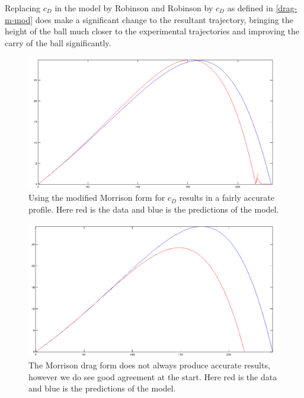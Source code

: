 Replacing $c_D$ in the model by Robinson and Robinson by $c_D$ as defined in \eqref{drag-m-mod} does
make a significant change to the resultant trajectory, bringing the height of the ball much closer to
the experimental trajectories and improving the carry of the ball significantly.


\begin{figure}[h]
\centering
\includegraphics[scale=0.5]{../images/trajectory-older.png}
\caption[Model with $c_{D}$ dependent on $Re$.]{Using the modified Morrison form for $c_{D}$ results 
in a fairly accurate profile. Here red is the data and blue is the predictions of the model.}
\end{figure}

\begin{figure}[h]
\centering
\includegraphics[scale=0.45]{../images/trajectory.png}
\caption[Second data set with Morrison drag.]{The Morrison drag form does not always produce accurate
results, however we do see good agreement at the start. Here red is the data and blue is the 
predictions of the model.}
\end{figure}

